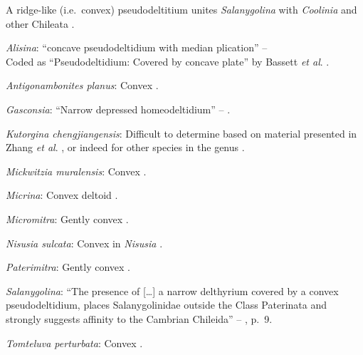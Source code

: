 \documentclass[openany]{book}
\begin{document}
A ridge-like (i.e.~convex) pseudodeltitium unites \emph{Salanygolina}
with \emph{Coolinia} and other Chileata
\citep[p.~6]{Holmer2009Theenigmatic}.

\hypertarget{Alisina-coding-118}{}
\emph{Alisina}: ``concave pseudodeltidium with median plication'' --
\citet{Williams2000LinguliformeaCraniiformea}\\
Coded as ``Pseudodeltidium: Covered by concave plate'' by Bassett
\emph{et al}. \citeyearpar{Bassett2001Functionalmorphology}.

\hypertarget{Antigonambonites_planus-coding-118}{}
\emph{Antigonambonites planus}: Convex \citep[fig.
508]{Williams2000LinguliformeaCraniiformea}.

\hypertarget{Gasconsia-coding-118}{}
\emph{Gasconsia}: ``Narrow depressed homeodeltidium'' --
\citet{Hanken1985Thetaxonomy}.

\hypertarget{Kutorgina_chengjiangensis-coding-118}{}
\emph{Kutorgina chengjiangensis}: Difficult to determine based on
material presented in Zhang \emph{et al}.
\citeyearpar{Zhang2007Rhynchonelliformeanbrachiopods}, or indeed for
other species in the genus
\citep[e.g.][]{Williams2000LinguliformeaCraniiformea, Skovsted2005EarlyCambrian, Holmer2018Theattachment}.

\hypertarget{Mickwitzia_muralensis-coding-118}{}
\emph{Mickwitzia muralensis}: Convex \citep[see][fig.
4B]{Balthasar2004Shellstructure}.

\hypertarget{Micrina-coding-118}{}
\emph{Micrina}: Convex deltoid \citep{Holmer2008TheEarly}.

\hypertarget{Micromitra-coding-118}{}
\emph{Micromitra}: Gently convex \citep[see][fig.
83.3]{Williams2000LinguliformeaCraniiformea}.

\hypertarget{Nisusia_sulcata-coding-118}{}
\emph{Nisusia sulcata}: Convex in \emph{Nisusia} \citep[see][fig.
8.4]{Rowell1985Theevolutionary}.

\hypertarget{Paterimitra-coding-118}{}
\emph{Paterimitra}: Gently convex \citep[see][fig.
83.1]{Williams2000LinguliformeaCraniiformea}.

\hypertarget{Salanygolina-coding-118}{}
\emph{Salanygolina}: ``The presence of {[}\ldots{}{]} a narrow
delthyrium covered by a convex pseudodeltidium, places Salanygolinidae
outside the Class Paterinata and strongly suggests affinity to the
Cambrian Chileida'' -- \citet{Holmer2009Theenigmatic}, p.~9.

\hypertarget{Tomteluva_perturbata-coding-118}{}
\emph{Tomteluva perturbata}: Convex \citep{Streng2016Anew}.
\end{document}
